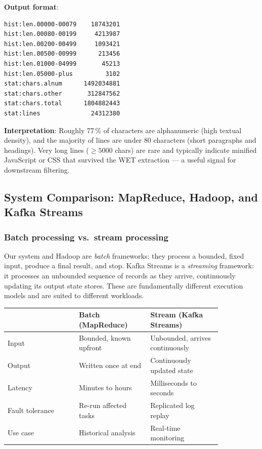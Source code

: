 \documentclass[11pt,a4paper]{article}
\begin{document}
\textbf{Output format}:
\begin{lstlisting}[style=codeblock]
hist:len.00000-00079    18743201
hist:len.00080-00199     4213987
hist:len.00200-00499     1093421
hist:len.00500-00999      213456
hist:len.01000-04999       45213
hist:len.05000-plus         3102
stat:chars.alnum      1492034881
stat:chars.other       312847562
stat:chars.total      1804882443
stat:lines              24312380
\end{lstlisting}

\textbf{Interpretation}: Roughly 77\,\% of characters are alphanumeric (high
textual density), and the majority of lines are under 80 characters (short
paragraphs and headings). Very long lines ($\geq 5000$ chars) are rare and
typically indicate minified JavaScript or CSS that survived the WET extraction
— a useful signal for downstream filtering.

\subsection{System Comparison: MapReduce, Hadoop, and Kafka Streams}

\subsubsection{Batch processing vs.\ stream processing}

Our system and Hadoop are \emph{batch} frameworks: they process a bounded,
fixed input, produce a final result, and stop. Kafka Streams is a
\emph{streaming} framework: it processes an unbounded sequence of records as
they arrive, continuously updating its output state stores. These are
fundamentally different execution models and are suited to different workloads.

\begin{center}\small
\begin{tabular}{p{0.28\linewidth} p{0.28\linewidth} p{0.28\linewidth}}
\toprule
 & \textbf{Batch (MapReduce)} & \textbf{Stream (Kafka Streams)} \\
\midrule
Input & Bounded, known upfront & Unbounded, arrives continuously \\
Output & Written once at end & Continuously updated state \\
Latency & Minutes to hours & Milliseconds to seconds \\
Fault tolerance & Re-run affected tasks & Replicated log replay \\
Use case & Historical analysis & Real-time monitoring \\
\bottomrule
\end{tabular}
\end{center}
\end{document}

